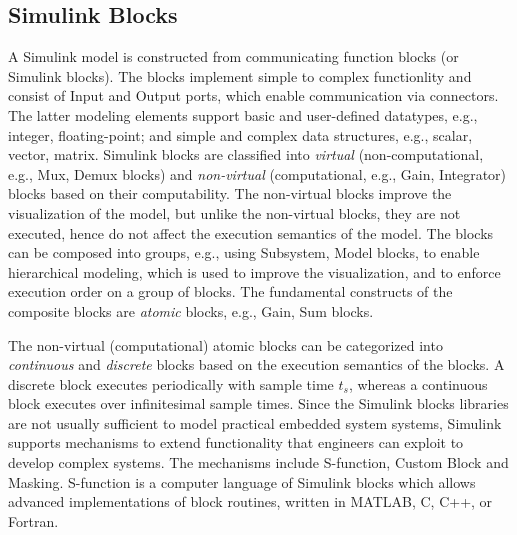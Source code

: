\subsection*{Simulink Blocks}
A Simulink model is constructed from communicating function blocks (or Simulink blocks). The blocks implement simple to complex functionlity and consist of Input and Output ports, which enable communication via connectors. The latter modeling elements support basic and user-defined datatypes, e.g., integer, floating-point; and simple and complex data structures, e.g., scalar, vector, matrix.  Simulink blocks are classified into \textit{virtual} (non-computational, e.g., Mux, Demux blocks) and \textit{non-virtual} (computational, e.g., Gain, Integrator) blocks based on their computability. The non-virtual blocks improve the visualization of the model, but unlike the non-virtual blocks, they are not executed, hence do not affect the execution semantics of the model.  The blocks can be composed into groups, e.g., using Subsystem, Model blocks, to enable hierarchical modeling, which is used to improve the visualization, and to enforce execution order on a group of blocks. The fundamental constructs of the composite blocks are \textit{atomic} blocks, e.g., Gain, Sum blocks.

The non-virtual (computational) atomic blocks can be categorized into \textit{continuous} and \textit{discrete} blocks based on the execution semantics of the blocks.  A discrete block executes periodically with sample time $t_s$, whereas a continuous block executes over infinitesimal sample times. Since the Simulink blocks libraries are not usually sufficient to model practical embedded system systems, Simulink supports mechanisms to extend functionality that engineers can exploit to develop complex systems. The mechanisms include S-function, Custom Block and Masking. S-function is a computer language of Simulink blocks which allows advanced implementations of block routines, written in MATLAB, C, C++, or Fortran.


